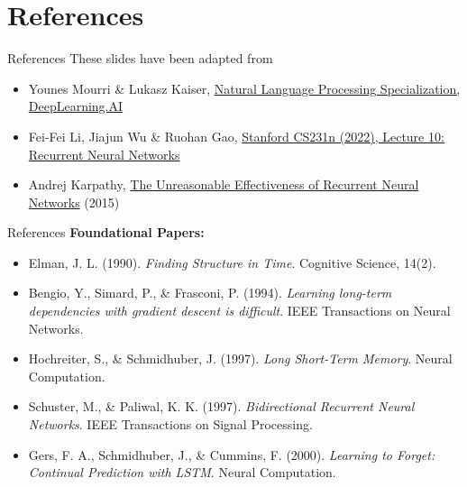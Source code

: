 \section{References}
\begin{frame}{References}
  These slides have been adapted from
  \begin{itemize}
    \item Younes Mourri \& Lukasz Kaiser, \href{https://www.deeplearning.ai/specializations/natural-language-processing}{Natural Language Processing Specialization, DeepLearning.AI}
    \item Fei-Fei Li, Jiajun Wu \& Ruohan Gao, \href{http://cs231n.stanford.edu/slides/2022/lecture_10_ruohan.pdf}{Stanford CS231n (2022), Lecture 10: Recurrent Neural Networks}
    \item Andrej Karpathy, \href{https://karpathy.github.io/2015/05/21/rnn-effectiveness/}{The Unreasonable Effectiveness of Recurrent Neural Networks} (2015)
  \end{itemize}
\end{frame}

\begin{frame}{References}
  \small
  \textbf{Foundational Papers:}
  \begin{itemize}
    \item Elman, J. L. (1990). \textit{Finding Structure in Time}. Cognitive Science, 14(2).
    \item Bengio, Y., Simard, P., \& Frasconi, P. (1994). \textit{Learning long-term dependencies with gradient descent is difficult}. IEEE Transactions on Neural Networks.
    \item Hochreiter, S., \& Schmidhuber, J. (1997). \textit{Long Short-Term Memory}. Neural Computation.
    \item Schuster, M., \& Paliwal, K. K. (1997). \textit{Bidirectional Recurrent Neural Networks}. IEEE Transactions on Signal Processing.
    \item Gers, F. A., Schmidhuber, J., \& Cummins, F. (2000). \textit{Learning to Forget: Continual Prediction with LSTM}. Neural Computation.
  \end{itemize}
\end{frame}

